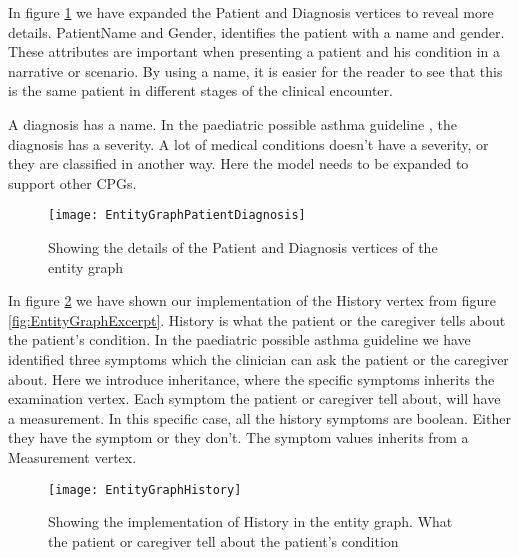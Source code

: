 In figure \ref{fig:EntityGraphPatientDiagnosis} we have expanded the Patient and Diagnosis vertices to reveal more details. PatientName and Gender, identifies the patient with a name and gender. These attributes are important when presenting a patient and his condition in a narrative or scenario. By using a name, it is easier for the reader to see that this is the same patient in different stages of the clinical encounter.

A diagnosis has a name. In the paediatric possible asthma guideline \cite{RepublicofKeny2016}, the diagnosis has a severity. A lot of medical conditions doesn't have a severity, or they are classified in another way. Here the model needs to be expanded to support other CPGs. 
\begin{figure}[h!]
	\caption {Showing the details of the Patient and Diagnosis vertices of the entity graph}
	\label{fig:EntityGraphPatientDiagnosis}
	\texttt{[image: EntityGraphPatientDiagnosis]}
\end{figure}

In figure \ref{fig:EntityGraphHistory} we have shown our implementation of the History vertex from figure \ref{fig:EntityGraphExcerpt}. History is what the patient or the caregiver tells about the patient's condition. In the paediatric possible asthma guideline \cite{RepublicofKeny2016} we have identified three symptoms which the clinician can ask the patient or the caregiver about. Here we introduce inheritance, where the specific symptoms inherits the examination vertex. Each symptom the patient or caregiver tell about, will have a measurement. In this specific case, all the history symptoms are boolean. Either they have the symptom or they don't. The symptom values inherits from a Measurement vertex.

\begin{figure}[h!]
	\caption {Showing the implementation of History in the entity graph. What the patient or caregiver tell about the patient's condition}
	\label{fig:EntityGraphHistory}
	\texttt{[image: EntityGraphHistory]}
\end{figure}

